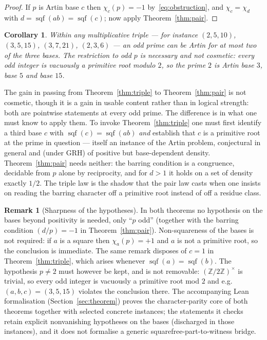 \documentclass[11pt,reqno]{amsart}
\theoremstyle{plain}
\newtheorem{corollary}[theorem]{Corollary}
\theoremstyle{definition}
\newtheorem{remark}[theorem]{Remark}
\DeclareMathOperator{\sqf}{sqf}
\newcommand{\Z}{\mathbb{Z}}
\begin{document}
\begin{proof}
If $p$ is Artin base $c$ then $\chi_c(p) = -1$ by~\eqref{eq:obstruction}, and
$\chi_c = \chi_d$ with $d = \sqf(ab) = \sqf(c)$; now apply
Theorem~\ref{thm:pair}.
\end{proof}

\begin{corollary}
\label{cor:twoofthree}
Within any multiplicative triple --- for instance $(2, 5, 10)$, $(3, 5, 15)$,
$(3, 7, 21)$, $(2, 3, 6)$ --- an \emph{odd} prime can be Artin for at most two
of the three bases. The restriction to odd $p$ is necessary and not cosmetic:
every odd integer is vacuously a primitive root modulo $2$, so the prime $2$
is Artin base $3$, base $5$ and base $15$.
\end{corollary}

The gain in passing from Theorem~\ref{thm:triple} to Theorem~\ref{thm:pair} is
not cosmetic, though it is a gain in usable content rather than in logical
strength: both are pointwise statements at every odd prime. The difference is
in what one must know to apply them. To invoke
Theorem~\ref{thm:triple} one must first identify a third base $c$ with
$\sqf(c) = \sqf(ab)$ \emph{and} establish that $c$ is a primitive root at the
prime in question --- itself an instance of the Artin problem, conjectural in
general and (under GRH) of positive but base-dependent density.
Theorem~\ref{thm:pair} needs neither: the barring condition is a congruence,
decidable from $p$ alone by reciprocity, and for $d > 1$ it holds on a set of
density exactly $1/2$. The triple law is the shadow that the pair law casts when
one insists on reading the barring character off a primitive root instead of off
a residue class.

\begin{remark}[Sharpness of the hypotheses]
In both theorems no hypothesis on the bases beyond positivity is needed, only ``$p$ odd'' (together with the barring condition $(d/p) = -1$ in Theorem~\ref{thm:pair}). Non-squareness of the bases is not
required: if $a$ is a square then $\chi_a(p) = +1$ and $a$ is not a primitive
root, so the conclusion is immediate. The same remark disposes of $c = 1$ in
Theorem~\ref{thm:triple}, which arises whenever $\sqf(a) = \sqf(b)$. The
hypothesis $p \ne 2$ must however be kept, and is not removable:
$(\Z/2\Z)^\times$ is trivial, so every odd integer is vacuously a primitive
root mod $2$ and e.g.\ $(a,b,c) = (3,5,15)$ violates the conclusion there. The accompanying Lean formalisation (Section~\ref{sec:theorem}) proves the
character-parity core of both theorems together with selected concrete
instances; the statements it checks retain explicit nonvanishing hypotheses on
the bases (discharged in those instances), and it does not formalise a generic
squarefree-part-to-witness bridge.
\end{remark}
\end{document}
